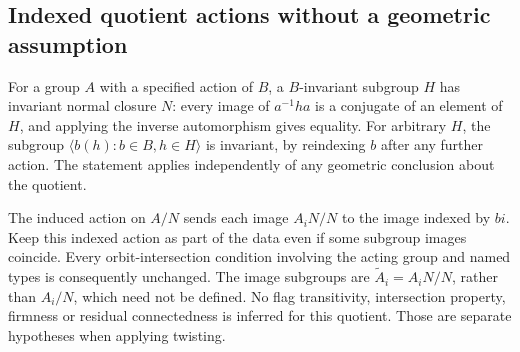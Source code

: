 \subsection{Indexed quotient actions without a geometric assumption}
For a group $A$ with a specified action of $B$, a $B$-invariant
subgroup $H$ has invariant normal closure $N$: every image of
$a^{-1}ha$ is a conjugate of an element of $H$, and applying the
inverse automorphism gives equality. For arbitrary $H$, the subgroup
$\langle b(h):b\in B,h\in H\rangle$ is invariant, by reindexing
$b$ after any further action. The statement applies independently of any geometric conclusion about the quotient.

The induced action on $A/N$ sends each image $A_iN/N$ to the image
indexed by $bi$. Keep this indexed action as part of the data even
if some subgroup images coincide. Every orbit-intersection condition
involving the acting group and named types is consequently unchanged.
The image subgroups are
$\widetilde A_i=A_iN/N$, rather than $A_i/N$, which need not be defined. No flag transitivity, intersection
property, firmness or residual connectedness is inferred for this
quotient. Those are separate hypotheses when applying twisting.
